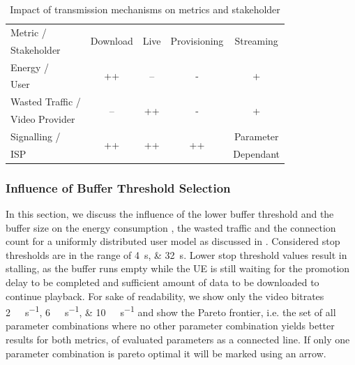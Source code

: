 \begin{table}
  \centering
  \begin{tabular}{lcccc}
    \toprule
    Metric /& \multirow{2}{*}{Download} & \multirow{2}{*}{Live} & \multirow{2}{*}{Provisioning} & \multirow{2}{*}{Streaming}\\
    Stakeholder & & & &\\
    \midrule
    Energy /       & \multirow{2}{*}{++}       & \multirow{2}{*}{--}   & \multirow{2}{*}{-} & \multirow{2}{*}{+}\\
    User & & & &\\
    Wasted Traffic / & \multirow{2}{*}{--} & \multirow{2}{*}{++} & \multirow{2}{*}{-} & \multirow{2}{*}{+} \\
    Video Provider & & & &\\
    Signalling /& \multirow{2}{*}{++} & \multirow{2}{*}{++} & \multirow{2}{*}{++} & Parameter\\
    \gls{ISP} & & & &Dependant\\
    \bottomrule
  \end{tabular}
  \caption{Impact of transmission mechanisms on metrics and stakeholder}
  \label{tab:application:lte_video:trade_offs:mechanism_selection:lessons_learned}
\end{table}

\subsubsection*{Influence of Buffer Threshold Selection}\label{sec:application:lte_video:trade_offs:buffer_threshold_influence}

In this section, we discuss the influence of the lower buffer threshold \bufferlower and the buffer size \buffersize on the energy consumption \power, the wasted traffic \meanwastedtraffic and the connection count \connectioncount for a uniformly distributed user model as discussed in .
Considered stop thresholds are in the range of \SIlist{4;32}{\second}.
Lower stop threshold values result in stalling, as the buffer runs empty while the \gls{UE} is still waiting for the promotion delay to be completed and sufficient amount of data to be downloaded to continue playback.
For sake of readability, we show only the video bitrates \SIlist{2;6;10}{\mega\bit\per\second} and show the Pareto frontier, i.e. the set of all parameter combinations where no other parameter combination yields better results for both metrics, of evaluated parameters as a connected line.
If only one parameter combination is pareto optimal it will be marked using an arrow.

